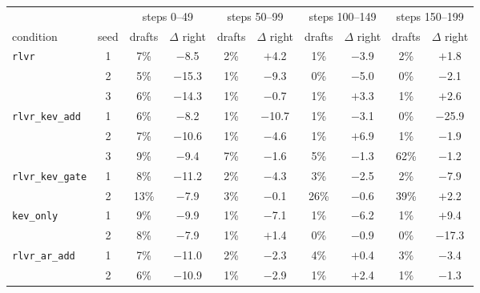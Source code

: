 \begin{tabular}{@{}lccccccccc@{}}
\toprule
 & & \multicolumn{2}{c}{steps 0--49} & \multicolumn{2}{c}{steps 50--99} & \multicolumn{2}{c}{steps 100--149} & \multicolumn{2}{c}{steps 150--199} \\ \cmidrule(l{2pt}r{2pt}){3-4}\cmidrule(l{2pt}r{2pt}){5-6}\cmidrule(l{2pt}r{2pt}){7-8}\cmidrule(l{2pt}r{2pt}){9-10}
condition & seed & drafts & $\Delta$ right & drafts & $\Delta$ right & drafts & $\Delta$ right & drafts & $\Delta$ right \\ \midrule
\texttt{rlvr} & 1 & 7\% & $-$8.5 & 2\% & $+$4.2 & 1\% & $-$3.9 & 2\% & $+$1.8 \\
 & 2 & 5\% & $-$15.3 & 1\% & $-$9.3 & 0\% & $-$5.0 & 0\% & $-$2.1 \\
 & 3 & 6\% & $-$14.3 & 1\% & $-$0.7 & 1\% & $+$3.3 & 1\% & $+$2.6 \\
\addlinespace
\texttt{rlvr\_kev\_add} & 1 & 6\% & $-$8.2 & 1\% & $-$10.7 & 1\% & $-$3.1 & 0\% & $-$25.9 \\
 & 2 & 7\% & $-$10.6 & 1\% & $-$4.6 & 1\% & $+$6.9 & 1\% & $-$1.9 \\
 & 3 & 9\% & $-$9.4 & 7\% & $-$1.6 & 5\% & $-$1.3 & 62\% & $-$1.2 \\
\addlinespace
\texttt{rlvr\_kev\_gate} & 1 & 8\% & $-$11.2 & 2\% & $-$4.3 & 3\% & $-$2.5 & 2\% & $-$7.9 \\
 & 2 & 13\% & $-$7.9 & 3\% & $-$0.1 & 26\% & $-$0.6 & 39\% & $+$2.2 \\
\addlinespace
\texttt{kev\_only} & 1 & 9\% & $-$9.9 & 1\% & $-$7.1 & 1\% & $-$6.2 & 1\% & $+$9.4 \\
 & 2 & 8\% & $-$7.9 & 1\% & $+$1.4 & 0\% & $-$0.9 & 0\% & $-$17.3 \\
\addlinespace
\texttt{rlvr\_ar\_add} & 1 & 7\% & $-$11.0 & 2\% & $-$2.3 & 4\% & $+$0.4 & 3\% & $-$3.4 \\
 & 2 & 6\% & $-$10.9 & 1\% & $-$2.9 & 1\% & $+$2.4 & 1\% & $-$1.3 \\
\bottomrule
\end{tabular}
